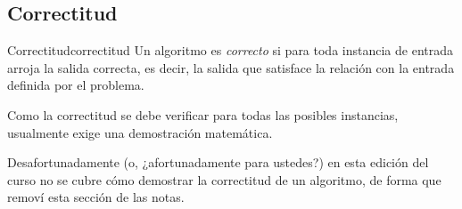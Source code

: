 \subsection{Correctitud}

\begin{definicion}{Correctitud}{correctitud}
  Un algoritmo es \emph{correcto} si para toda instancia de entrada arroja la salida correcta, es decir, la salida que satisface la relación con la entrada definida por el problema.
\end{definicion}

Como la correctitud se debe verificar para todas las posibles instancias, usualmente exige una demostración matemática.

Desafortunadamente (o, ¿afortunadamente para ustedes?) en esta edición del curso no se cubre cómo demostrar la correctitud de un algoritmo, de forma que removí esta sección de las notas.